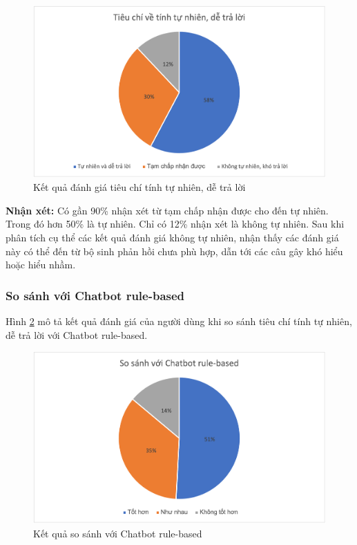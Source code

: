 \begin{center}
    \begin{figure}[h!]
        \begin{center}
         \includegraphics[scale=0.91]{chapter7/img/tieuchi3.png}
        \end{center}
        \caption{Kết quả đánh giá tiêu chí tính tự nhiên, dễ trả lời}
        \label{fig:tieuchi3}
    \end{figure}
\end{center}

\textbf{Nhận xét:}
Có gần 90\% nhận xét từ tạm chấp nhận được cho đến tự nhiên. Trong đó hơn 50\% là tự nhiên. Chỉ có 12\% nhận xét là không tự nhiên. Sau khi phân tích cụ thể các kết quả đánh giá không tự nhiên, nhận thấy các đánh giá này có thể đến từ bộ sinh phản hồi chưa phù hợp, dẫn tới các câu gây khó hiểu hoặc hiểu nhầm.

\subsubsection{So sánh với Chatbot rule-based}
Hình \ref{fig:tieuchi32} mô tả kết quả đánh giá của người dùng khi so sánh tiêu chí tính tự nhiên, dễ trả lời với Chatbot rule-based.

\begin{center}
    \begin{figure}[h!]
        \begin{center}
         \includegraphics[scale=0.91]{chapter7/img/tieuchi3_2.png}
        \end{center}
        \caption{Kết quả so sánh với Chatbot rule-based}
        \label{fig:tieuchi32}
    \end{figure}
\end{center}

